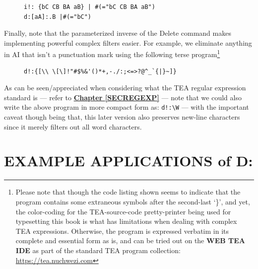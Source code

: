 \documentclass[a4paper, 18pt]{book} %
\begin{document}
 
 \begin{figure}[H]
 \Large
  \centering
  \begin{tcolorbox}[teaterminalstyle, title=TEA Program: D: with chained patterns]
  \begin{lstlisting}[language=TEA]
i!: {bC CB BA aB} | #(="bC CB BA aB")
d:[aA]:.B |#(="bC")
   \end{lstlisting}
  \end{tcolorbox}
\end{figure}


Finally, note that the parameterized inverse of the Delete command makes implementing powerful complex filters easier. For example, we eliminate anything in AI that isn't a punctuation mark using the following terse program\footnote{Please note that though the code listing shown seems to indicate that the program contains some extraneous symbols after the second-last `\}', and yet, the color-coding for the TEA-source-code pretty-printer being used for typesetting this book is what has limitations when dealing with complex TEA expressions. Otherwise, the program is expressed verbatim in its complete and essential form as is, and can be tried out on the \textbf{WEB TEA IDE} as part of the standard TEA program collection: \url{https://tea.nuchwezi.com}} 


 \begin{figure}[H]
 \Large
  \centering
  \begin{tcolorbox}[teaterminalstyle, title=TEA Program: De PUNCTURA Filter]
  \begin{lstlisting}[language=TEA]
d!:{[\\ \[\]!"#$%&'()*+,-./:;<=>?@^_`{|}~]} 
   \end{lstlisting}
  \end{tcolorbox}
\end{figure}

As can be seen/appreciated when considering what the TEA regular expression standard is --- refer to \textbf{\hyperref[SECREGEXP]{Chapter \ref{SECREGEXP}}} --- note that we could also write the above program in more compact form as: \texttt{d!:\textbackslash{}W} --- with the important caveat though being that, this later version also preserves new-line characters since it merely filters out all word characters.

 
\section{EXAMPLE APPLICATIONS of D:}
\label{SECEXAMPD}
\end{document}

